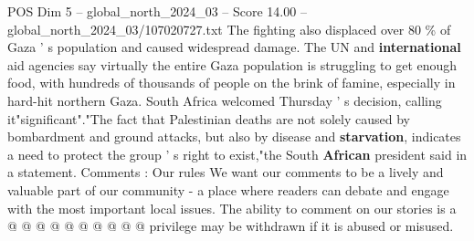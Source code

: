 \begin{textsample}{POS Dim 5 – global\_north\_2024\_03 – Score 14.00 – global\_north\_2024\_03/107020727.txt}
The fighting also displaced over 80 \% of Gaza ' s population and caused widespread damage.
The UN and \textbf{international} aid agencies say virtually the entire Gaza population is struggling to get enough food, with hundreds of thousands of people on the brink of famine, especially in hard-hit northern Gaza.
South Africa welcomed Thursday ' s decision, calling it"significant"."The fact that Palestinian deaths are not solely caused by bombardment and ground attacks, but also by disease and \textbf{starvation}, indicates a need to protect the group ' s right to exist,"the South \textbf{African} president said in a statement.
Comments : Our rules We want our comments to be a lively and valuable part of our community - a place where readers can debate and engage with the most important local issues.
The ability to comment on our stories is a @ @ @ @ @ @ @ @ @ @ privilege may be withdrawn if it is abused or misused.

\end{textsample}
